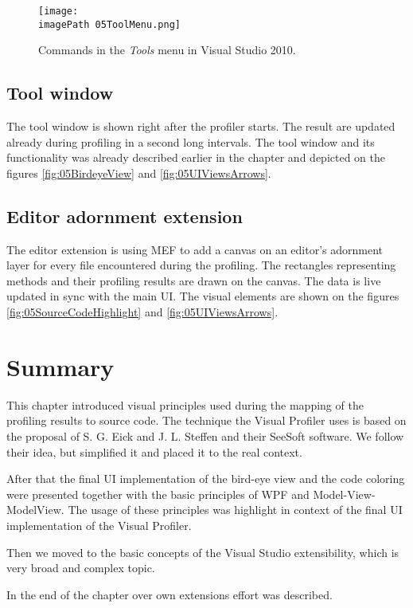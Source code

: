  \begin{figure}
	\centering
		\texttt{[image: \\imagePath 05ToolMenu.png]}
		\caption{Commands in the \textit{Tools} menu in Visual Studio 2010. }
	\label{fig:05ToolMenu}
\end{figure}

\subsection{Tool window}
The tool window is shown right after the profiler starts. The result are updated already during profiling in a second long intervals. The tool window and its functionality was already described earlier in the chapter and depicted on the figures \ref{fig:05BirdeyeView} and \ref{fig:05UIViewsArrows}.

\subsection{Editor adornment extension}
The editor extension is using MEF to add a canvas on an editor's adornment layer for every file encountered during the profiling. The rectangles representing methods and their profiling results are drawn on the canvas. The data is live updated in sync with the main UI. The visual elements are shown on the figures \ref{fig:05SourceCodeHighlight} and \ref{fig:05UIViewsArrows}.

\section{Summary}
This chapter introduced visual principles used during the mapping of the profiling results to source code. The technique the Visual Profiler uses is based on the proposal of S. G. Eick and J. L. Steffen and their SeeSoft software. We follow their idea, but simplified it and placed it to the real context.

After that the final UI implementation of the bird-eye view and the code coloring were presented together with the basic principles of WPF and Model-View-ModelView. The usage of these principles was highlight in context of the final UI implementation of the Visual Profiler.

Then we moved to the basic concepts of the Visual Studio extensibility, which is very broad and complex topic.

In the end of the chapter over own extensions effort was described.











